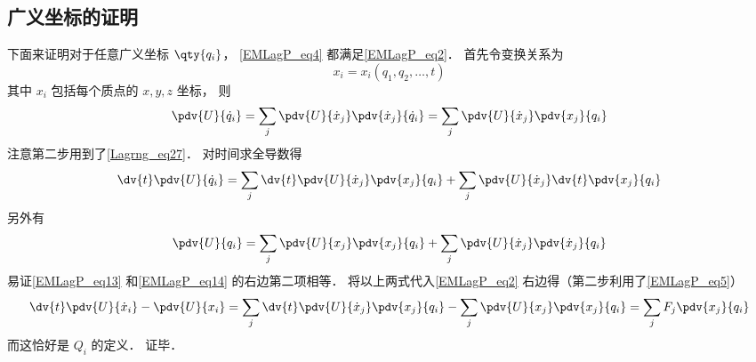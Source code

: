 \subsection{广义坐标的证明}
下面来证明对于任意广义坐标 $\qty{q_i}$， \autoref{EMLagP_eq4} 都满足\autoref{EMLagP_eq2}． 首先令变换关系为
\begin{equation}
x_i = x_i(q_1, q_2, \dots, t)
\end{equation}
其中 $x_i$ 包括每个质点的 $x, y, z$ 坐标， 则
\begin{equation}
\pdv{U}{\dot q_i} = \sum_j \pdv{U}{\dot x_j} \pdv{\dot x_j}{\dot q_i} = \sum_j \pdv{U}{\dot x_j} \pdv{x_j}{q_i}
\end{equation}
注意第二步用到了\autoref{Lagrng_eq27}． 对时间求全导数得
\begin{equation}\label{EMLagP_eq13}
\dv{t} \pdv{U}{\dot q_i} = \sum_j \dv{t}\pdv{U}{\dot x_j} \pdv{x_j}{q_i} + \sum_j \pdv{U}{\dot x_j} \dv{t} \pdv{x_j}{q_i}
\end{equation}
另外有
\begin{equation}\label{EMLagP_eq14}
\pdv{U}{q_i} = \sum_j \pdv{U}{x_j} \pdv{x_j}{q_i} + \sum_j \pdv{U}{\dot x_j} \pdv{\dot x_j}{q_i}
\end{equation}
易证\autoref{EMLagP_eq13} 和\autoref{EMLagP_eq14} 的右边第二项相等． 将以上两式代入\autoref{EMLagP_eq2} 右边得（第二步利用了\autoref{EMLagP_eq5}）
\begin{equation}
\dv{t} \pdv{U}{\dot x_i} - \pdv{U}{x_i} =  \sum_j \dv{t}\pdv{U}{\dot x_j} \pdv{x_j}{q_i} - \sum_j \pdv{U}{x_j} \pdv{x_j}{q_i} = \sum_j F_j \pdv{x_j}{q_i}
\end{equation}
而这恰好是 $Q_i$ 的定义．%
证毕．
